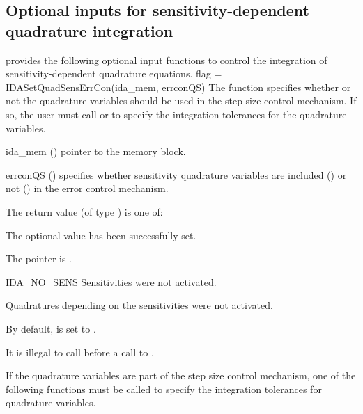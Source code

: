 
\subsection{Optional inputs for sensitivity-dependent quadrature integration}
\label{ss:quad_sens_optional_input}
{\idas} provides the following optional input functions to control the integration
of sensitivity-dependent quadrature equations.
{
 flag = IDASetQuadSensErrCon(ida\_mem, errconQS)
}
{
  The function  specifies whether or not the
  quadrature variables should be used in the step size control
  mechanism. If so, the user must call  or
   to specify the 
  integration tolerances for the quadrature variables.  
}
{
  \begin{args}[errconQS]
  \item[ida\_mem] ()
    pointer to the {\idas} memory block.
  \item[errconQS] ()
    specifies whether sensitivity quadrature variables are included () or not
    () in the error control mechanism. 
  \end{args}
}
{
  The return value  (of type ) is one of:
  \begin{args}
  \item[\Id{IDA\_SUCCESS}] 
    The optional value has been successfully set.
  \item[\Id{IDA\_MEM\_NULL}]
    The  pointer is .
  \item[IDA\_NO\_SENS]
    Sensitivities were not activated.
  \item[\Id{IDA\_NO\_QUADSENS}] 
    Quadratures depending on the sensitivities were not activated.
  \end{args}
}
{
  By default,  is set to . 

  {\warn}It is illegal to call  before a call 
  to .
}


If the quadrature variables are part of the step size control mechanism, 
one of the following functions must be called to specify the
integration tolerances for quadrature variables. 

